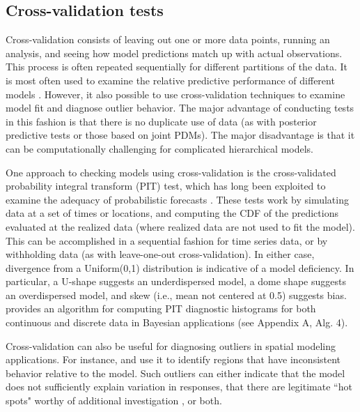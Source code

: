 \documentclass[12pt,english]{article}
\begin{document}
\begin{spacing}{1.9}
\subsection{Cross-validation tests}

Cross-validation consists of leaving out one or more data points,
running an analysis, and seeing how model predictions match up with
actual observations.  This process is often repeated sequentially for
different partitions of the data.  It is most often used to examine
the relative predictive performance of different models \citep[i.e.,
for model selection; see e.g.][]{ArlotCelisse2010}.  However, it also
possible to use cross-validation techniques to examine model fit and
diagnose outlier behavior.  The major advantage of conducting tests in
this fashion is that there is no duplicate use of data (as with
posterior predictive tests or those based on joint PDMs).  The major
disadvantage is that it can be computationally challenging for
complicated hierarchical models.

One approach to checking models using cross-validation is the
cross-validated probability integral transform (PIT) test, which has
long been exploited to examine the adequacy of probabilistic forecasts
\citep[e.g.,][]{Dawid1984,Fruiiwirth1996,GneitingEtAl2007,CzadoEtAl2009}. These
tests work by simulating data at a set of times or locations, and
computing the CDF of the predictions evaluated at the realized data
(where realized data are not used to fit the model).  This can be
accomplished in a sequential fashion for time series data, or by
withholding data (as with leave-one-out cross-validation).  In either
case, divergence from a Uniform(0,1) distribution is indicative of a
model deficiency.  In particular, a U-shape suggests an underdispersed
model, a dome shape suggests an overdispersed model, and skew (i.e.,
mean not centered at 0.5) suggests bias.  \citet{Congdon2014} provides
an algorithm for computing PIT diagnostic histograms for both
continuous and discrete data in Bayesian applications (see Appendix A,
Alg. 4).

Cross-validation can also be useful for diagnosing outliers in spatial
modeling applications.  For instance, \citet{SternCressie2000} and
\citet{MarshallSpiegelhalter2003} use it to identify regions that have
inconsistent behavior relative to the model.  Such outliers can either
indicate that the model does not sufficiently explain variation in
responses, that there are legitimate ``hot spots" worthy of additional
investigation \citep{MarshallSpiegelhalter2003}, or both.


\end{spacing}
\end{document}
